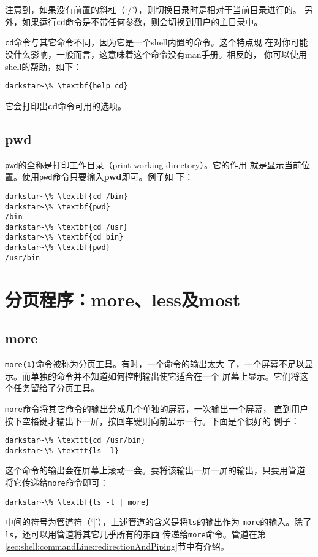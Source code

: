 注意到，如果没有前置的斜杠（`/'），则切换目录时是相对于当前目录进行的。
另外，如果运行\texttt{cd}命令是不带任何参数，则会切换到用户的主目录中。

\texttt{cd}命令与其它命令不同，因为它是一个shell内置的命令。这个特点现
在对你可能没什么影响，一般而言，这意味着这个命令没有man手册。相反的，
你可以使用shell的帮助，如下：
\begin{Verbatim}[frame=single,commandchars=\\\{\}]
darkstar~\% \textbf{help cd}
\end{Verbatim}
它会打印出\textbf{cd}命令可用的选项。

\subsection{pwd}
\label{sec:handlingFilesAndDirectories:navigation:pwd}
\texttt{pwd}的全称是打印工作目录（print working directory）。它的作用
就是显示当前位置。使用\texttt{pwd}命令只要输入\textbf{pwd}即可。例子如
下：
\begin{Verbatim}[frame=single,commandchars=\\\{\}]
darkstar~\% \textbf{cd /bin}
darkstar~\% \textbf{pwd}
/bin
darkstar~\% \textbf{cd /usr}
darkstar~\% \textbf{cd bin}
darkstar~\% \textbf{pwd}
/usr/bin
\end{Verbatim}

\section{分页程序：more、less及most}
\label{sec:handlingFilesAndDirectories:pagers}

\subsection{more}
\label{sec:handlingFilesAndDirectories:pagers:more}
\texttt{more\textbf{(1)}}命令被称为分页工具。有时，一个命令的输出太大
了，一个屏幕不足以显示。而单独的命令并不知道如何控制输出使它适合在一个
屏幕上显示。它们将这个任务留给了分页工具。

\texttt{more}命令将其它命令的输出分成几个单独的屏幕，一次输出一个屏幕，
直到用户按下空格键才输出下一屏，按回车键则向前显示一行。下面是个很好的
例子：
\begin{Verbatim}[frame=single,commandchars=\\\{\}]
darkstar~\% \texttt{cd /usr/bin}
darkstar~\% \texttt{ls -l}
\end{Verbatim}

这个命令的输出会在屏幕上滚动一会。要将该输出一屏一屏的输出，只要用管道
将它传递给\texttt{more}命令即可：
\begin{Verbatim}[frame=single,commandchars=\\\{\}]
darkstar~\% \textbf{ls -l | more}
\end{Verbatim}
中间的符号为管道符（`|'），上述管道的含义是将\texttt{ls}的输出作为
\texttt{more}的输入。除了\texttt{ls}，还可以用管道将其它几乎所有的东西
传递给\texttt{more}命令。管道在第
\ref{sec:shell:commandLine:redirectionAndPiping}节中有介绍。

